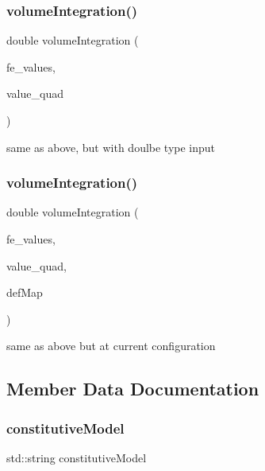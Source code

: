 \subsubsection{\texorpdfstring{volumeIntegration()}{volumeIntegration()}\hspace{0.1cm}{\footnotesize\ttfamily [5/6]}}
{\footnotesize\ttfamily double volume\+Integration (\begin{DoxyParamCaption}\item[{const F\+E\+Values$<$ dim $>$ \&}]{fe\+\_\+values,  }\item[{Table$<$ 1, double $>$ \&}]{value\+\_\+quad }\end{DoxyParamCaption})}

same as above, but with doulbe type input \mbox{\label{class_residual_ae097f5d9f2a92108cb0a1c7ecf4510c3}} 
\subsubsection{\texorpdfstring{volumeIntegration()}{volumeIntegration()}\hspace{0.1cm}{\footnotesize\ttfamily [6/6]}}
{\footnotesize\ttfamily double volume\+Integration (\begin{DoxyParamCaption}\item[{const F\+E\+Values$<$ dim $>$ \&}]{fe\+\_\+values,  }\item[{Table$<$ 1, double $>$ \&}]{value\+\_\+quad,  }\item[{\mbox{\hyperlink{structdeformation_map}{deformation\+Map}}$<$ T, dim $>$ \&}]{def\+Map }\end{DoxyParamCaption})}

same as above but at current configuration 

\subsection{Member Data Documentation}
\mbox{\label{class_residual_a83be21658f82b0682f84f5dc9f10190f}} 
\subsubsection{\texorpdfstring{constitutiveModel}{constitutiveModel}}
{\footnotesize\ttfamily std\+::string constitutive\+Model}

